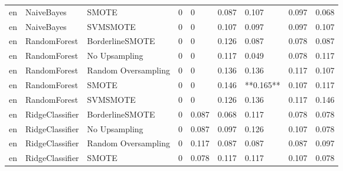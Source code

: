 \begin{tabular}{lllllllll}
      en &                   NaiveBayes &               SMOTE &     0 &                         0 &                 0.087 &                  0.107 &                                   0.097 &     0.068 \\
      en &                   NaiveBayes &            SVMSMOTE &     0 &                         0 &                 0.107 &                  0.097 &                                   0.097 &     0.107 \\
      en &                 RandomForest &     BorderlineSMOTE &     0 &                         0 &                 0.126 &                  0.087 &                                   0.078 &     0.087 \\
      en &                 RandomForest &       No Upsampling &     0 &                         0 &                 0.117 &                  0.049 &                                   0.078 &     0.117 \\
      en &                 RandomForest & Random Oversampling &     0 &                         0 &                 0.136 &                  0.136 &                                   0.117 &     0.107 \\
      en &                 RandomForest &               SMOTE &     0 &                         0 &                 0.146 &              **0.165** &                                   0.107 &     0.117 \\
      en &                 RandomForest &            SVMSMOTE &     0 &                         0 &                 0.126 &                  0.136 &                                   0.117 &     0.146 \\
      en &              RidgeClassifier &     BorderlineSMOTE &     0 &                     0.087 &                 0.068 &                  0.117 &                                   0.078 &     0.078 \\
      en &              RidgeClassifier &       No Upsampling &     0 &                     0.087 &                 0.097 &                  0.126 &                                   0.107 &     0.078 \\
      en &              RidgeClassifier & Random Oversampling &     0 &                     0.117 &                 0.087 &                  0.087 &                                   0.087 &     0.097 \\
      en &              RidgeClassifier &               SMOTE &     0 &                     0.078 &                 0.117 &                  0.117 &                                   0.107 &     0.078 \\

\end{tabular}
